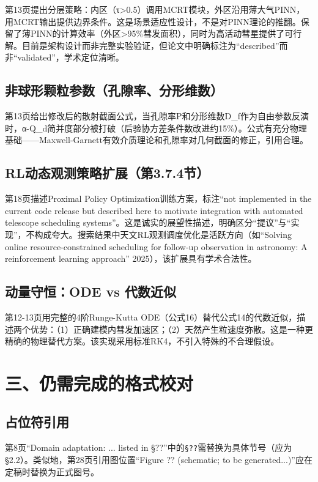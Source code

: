 \documentclass[12pt]{article}
\begin{document}
第13页提出分层策略：内区（τ>0.5）调用MCRT模块，外区沿用薄大气PINN，用MCRT输出提供边界条件。这是场景适应性设计，不是对PINN理论的推翻。保留了薄PINN的计算效率（外区>95\%彗发面积），同时为高活动彗星提供了可行解。目前是架构设计而非完整实验验证，但论文中明确标注为“described”而非“validated”，学术定位清晰。

\subsection{非球形颗粒参数（孔隙率、分形维数）}

第13页给出修改后的散射截面公式，当孔隙率P和分形维数D\_f作为自由参数反演时，α-Q\_d简并度部分被打破（后验协方差条件数改进约15\%）。公式有充分物理基础——Maxwell-Garnett有效介质理论和孔隙率对几何截面的修正，引用合理。

\subsection{RL动态观测策略扩展（第3.7.4节）}

第18页描述Proximal Policy Optimization训练方案，标注“not implemented in the current code release but described here to motivate integration with automated telescope scheduling systems”。这是诚实的展望性描述，明确区分“提议”与“实现”，不构成夸大。搜索结果中天文RL观测调度优化是活跃方向（如``Solving online resource-constrained scheduling for follow-up observation in astronomy: A reinforcement learning approach'' 2025），该扩展具有学术合法性。

\subsection{动量守恒：ODE vs 代数近似}

第12-13页用完整的4阶Runge-Kutta ODE（公式16）替代公式14的代数近似，描述两个优势：（1）正确建模内彗发加速区；（2）天然产生粒速度弥散。这是一种更精确的物理替代方案。该实现采用标准RK4，不引入特殊的不合理假设。

\section{三、仍需完成的格式校对}

\subsection{占位符引用}

第8页“Domain adaptation: ... listed in §??”中的\texttt{\S ??}需替换为具体节号（应为§2.2）。类似地，第28页引用图位置“Figure ?? (schematic; to be generated...)”应在定稿时替换为正式图号。
\end{document}
